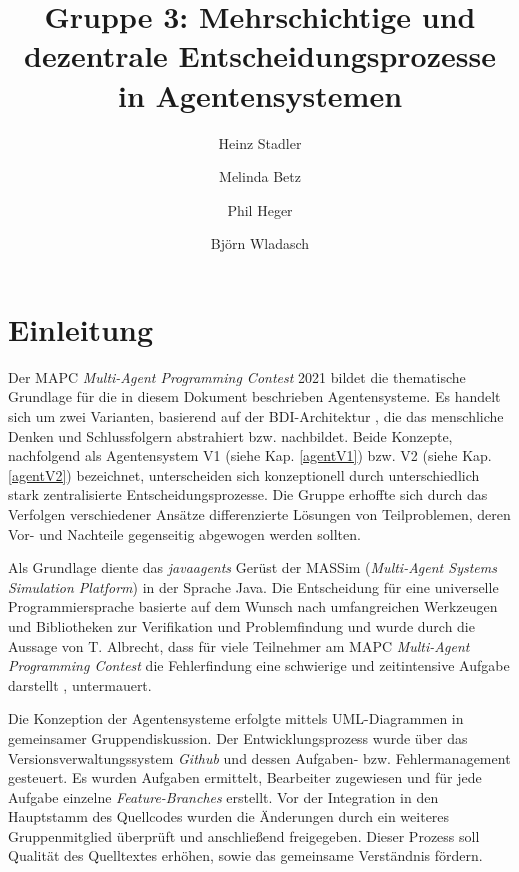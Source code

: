 \documentclass[runningheads]{llncs}
\begin{document}
	\title{Gruppe 3: Mehrschichtige und dezentrale Entscheidungsprozesse in Agentensystemen}
	\author{Heinz Stadler\and
		Melinda Betz\and
		Phil Heger\and
		Björn Wladasch}
	\maketitle              %
	\section{Einleitung}
	Der MAPC \textit{Multi-Agent Programming Contest} 2021 \cite{MAPC2021} bildet die thematische Grundlage für die in diesem Dokument beschrieben Agentensysteme. Es handelt sich um zwei Varianten, basierend auf der BDI-Architektur \cite{Bratman1987}, die das menschliche Denken und Schlussfolgern abstrahiert bzw. nachbildet. Beide Konzepte, nachfolgend als Agentensystem V1 (siehe Kap. \ref{agentV1}) bzw. V2 (siehe Kap. \ref{agentV2}) bezeichnet, unterscheiden sich konzeptionell durch unterschiedlich stark zentralisierte Entscheidungsprozesse.
	Die Gruppe erhoffte sich durch das Verfolgen verschiedener Ansätze differenzierte Lösungen von Teilproblemen, deren Vor- und Nachteile gegenseitig abgewogen werden sollten.
	
	
	Als Grundlage diente das \textit{javaagents} Gerüst der MASSim (\textit{Multi-Agent Systems Simulation Platform}) \cite{EISMASSim} in der Sprache Java. Die Entscheidung für eine universelle Programmiersprache basierte auf dem Wunsch nach umfangreichen Werkzeugen und Bibliotheken zur Verifikation und Problemfindung und wurde durch die Aussage von T. Albrecht, dass für viele Teilnehmer am MAPC \textit{Multi-Agent Programming Contest} die Fehlerfindung eine schwierige und zeitintensive Aufgabe darstellt \cite[S. 17]{Ahlbrecht2021}, untermauert.
	
	Die Konzeption der Agentensysteme erfolgte mittels UML-Diagrammen in gemeinsamer Gruppendiskussion.
	Der Entwicklungsprozess wurde über das Versionsverwaltungssystem \textit{Github} und dessen Aufgaben- bzw. Fehlermanagement gesteuert. Es wurden Aufgaben ermittelt, Bearbeiter zugewiesen und für jede Aufgabe einzelne \textit{Feature-Branches} erstellt. Vor der Integration in den Hauptstamm des Quellcodes wurden die Änderungen durch ein weiteres Gruppenmitglied überprüft und anschließend freigegeben. Dieser Prozess soll Qualität des Quelltextes erhöhen, sowie das gemeinsame Verständnis fördern.
	
\end{document}
